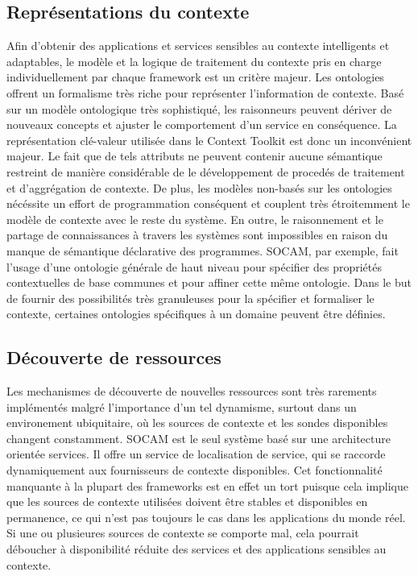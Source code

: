 \subsection{Représentations du contexte}

Afin d'obtenir des applications et services sensibles au contexte intelligents
et adaptables, le modèle et la logique de traitement du contexte pris en charge
individuellement par chaque framework est un critère majeur. Les ontologies
offrent un formalisme très riche pour représenter l'information de contexte.
Basé sur un modèle ontologique très sophistiqué, les raisonneurs peuvent dériver
de nouveaux concepts et ajuster le comportement d'un service en conséquence. La
représentation clé-valeur utilisée dans le Context Toolkit est donc un
inconvénient majeur. Le fait que de tels attributs ne peuvent contenir aucune
sémantique restreint de manière considérable de le développement de procedés de
traitement et d'aggrégation de contexte. De plus, les modèles non-basés sur les
ontologies nécéssite un effort de programmation conséquent et couplent très
étroitemment le modèle de contexte avec le reste du système. En outre, le
raisonnement et le partage de connaissances à travers les systèmes sont
impossibles en raison du manque de sémantique déclarative des programmes. SOCAM,
par exemple, fait l'usage d'une ontologie générale de haut niveau pour spécifier
des propriétés contextuelles de base communes et pour affiner cette même
ontologie. Dans le but de fournir des possibilités très granuleuses pour la
spécifier et formaliser le contexte, certaines ontologies spécifiques à un
domaine peuvent être définies.

\subsection{Découverte de ressources}

Les mechanismes de découverte de nouvelles ressources sont très rarements
implémentés malgré l'importance d'un tel dynamisme, surtout dans un environement
ubiquitaire, où les sources de contexte et les sondes disponibles changent
constamment. SOCAM est le seul système basé sur une architecture orientée
services. Il offre un service de localisation de service, qui se raccorde
dynamiquement aux fournisseurs de contexte disponibles. Cet fonctionnalité
manquante à la plupart des frameworks est en effet un tort puisque cela implique
que les sources de contexte utilisées doivent être stables et disponibles en
permanence, ce qui n'est pas toujours le cas dans les applications du monde
réel. Si une ou plusieures sources de contexte se comporte mal, cela pourrait
déboucher à disponibilité réduite des services et des applications sensibles au
contexte.

